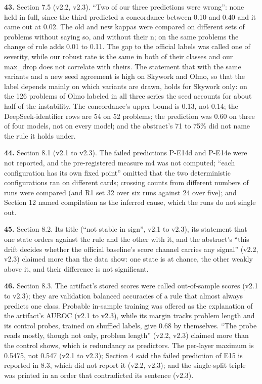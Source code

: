 \noindent\textbf{43.} Section 7.5 (v2.2, v2.3). ``Two of our three predictions were wrong'': none held in full, since the third predicted a concordance between 0.10 and 0.40 and it came out at 0.02. The old and new kappas were compared on different sets of problems without saying so, and without their n; on the same problems the change of rule adds 0.01 to 0.11. The gap to the official labels was called one of severity, while our robust rate is the same in both of their classes and our max\_drop does not correlate with theirs. The statement that with the same variants and a new seed agreement is high on Skywork and Olmo, so that the label depends mainly on which variants are drawn, holds for Skywork only: on the 126 problems of Olmo labeled in all three series the seed accounts for about half of the instability. The concordance's upper bound is 0.13, not 0.14; the DeepSeek-identifier rows are 54 on 52 problems; the prediction was 0.60 on three of four models, not on every model; and the abstract's 71 to 75\% did not name the rule it holds under.
\par

\noindent\textbf{44.} Section 8.1 (v2.1 to v2.3). The failed predictions P-E14d and P-E14e were not reported, and the pre-registered measure m4 was not computed; ``each configuration has its own fixed point'' omitted that the two deterministic configurations ran on different cards; crossing counts from different numbers of runs were compared (and R1 set 32 over six runs against 24 over five); and Section 12 named compilation as the inferred cause, which the runs do not single out.
\par

\noindent\textbf{45.} Section 8.2. Its title (``not stable in sign'', v2.1 to v2.3), its statement that one state orders against the rule and the other with it, and the abstract's ``this drift decides whether the official baseline's score channel carries any signal'' (v2.2, v2.3) claimed more than the data show: one state is at chance, the other weakly above it, and their difference is not significant.
\par

\noindent\textbf{46.} Section 8.3. The artifact's stored scores were called out-of-sample scores (v2.1 to v2.3); they are validation balanced accuracies of a rule that almost always predicts one class. Probable in-sample training was offered as the explanation of the artifact's AUROC (v2.1 to v2.3), while its margin tracks problem length and its control probes, trained on shuffled labels, give 0.68 by themselves. ``The probe reads mostly, though not only, problem length'' (v2.2, v2.3) claimed more than the control shows, which is redundancy as predictors. The per-layer maximum is 0.5475, not 0.547 (v2.1 to v2.3); Section 4 said the failed prediction of E15 is reported in 8.3, which did not report it (v2.2, v2.3); and the single-split triple was printed in an order that contradicted its sentence (v2.3).
\par


